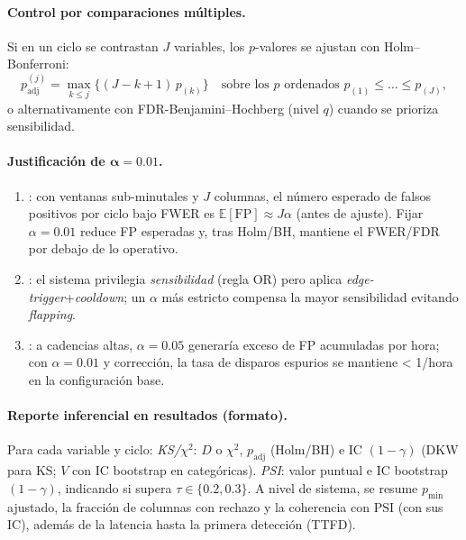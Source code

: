 \paragraph{Control por comparaciones múltiples.}
Si en un ciclo se contrastan $J$ variables, los $p$-valores se ajustan con Holm–Bonferroni:
\[
p^{(j)}_{\text{adj}}=\max_{k\le j}\big\{(J-k+1)\,p_{(k)}\big\}\quad\text{sobre los }p\text{ ordenados }p_{(1)}\le\dots\le p_{(J)},
\]
o alternativamente con FDR-Benjamini–Hochberg (nivel $q$) cuando se prioriza sensibilidad.

\paragraph{Justificación de $\boldsymbol{\alpha=0.01}$.}

\begin{enumerate}
    \item {}: con ventanas sub-minutales y $J$ columnas, el número esperado de falsos positivos por ciclo bajo FWER es $\mathbb{E}[\mathrm{FP}]\approx J\alpha$ (antes de ajuste). Fijar $\alpha=0.01$ reduce FP esperadas y, tras Holm/BH, mantiene el FWER/FDR por debajo de lo operativo.\newline
    \item {}: el sistema privilegia \emph{sensibilidad} (regla OR) pero aplica \emph{edge-trigger}+\emph{cooldown}; un $\alpha$ más estricto compensa la mayor sensibilidad evitando \emph{flapping}.\newline
    \item {}: a cadencias altas, $\alpha=0.05$ generaría exceso de FP acumuladas por hora; con $\alpha=0.01$ y corrección, la tasa de disparos espurios se mantiene < 1/hora en la configuración base.
\end{enumerate}

\paragraph{Reporte inferencial en resultados (formato).}
Para cada variable y ciclo: \emph{KS/$\chi^2$}: $D$ o $\chi^2$, $p_{\text{adj}}$ (Holm/BH) e IC $(1-\gamma)$ (DKW para KS; $V$ con IC bootstrap en categóricas). \emph{PSI}: valor puntual e IC bootstrap $(1-\gamma)$, indicando si supera $\tau\in\{0.2,0.3\}$. A nivel de sistema, se resume $p_{\min}$ ajustado, la fracción de columnas con rechazo y la coherencia con $\mathrm{PSI}$ (con sus IC), además de la latencia hasta la primera detección (TTFD).


